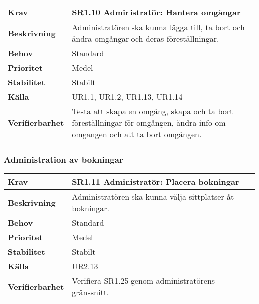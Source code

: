 \documentclass[a4paper, twoside, 11pt, titlepage]{article}
\begin{document}
		\begin{tabular} { p{2.6cm} p{12.5cm} }
			\hline
			\sffamily\textbf{Krav} & \sffamily\textbf{SR1.10 Administratör: Hantera omgångar } \\
			\hline
			\sffamily\textbf{Beskrivning} & Administratören ska kunna lägga till, ta bort och ändra omgångar och deras föreställningar.  \\
			\hline
			\sffamily\textbf{Behov} & Standard  \\
			\hline
			\sffamily\textbf{Prioritet} & Medel  \\
			\hline
			\sffamily\textbf{Stabilitet} & Stabilt  \\
			\hline
			\sffamily\textbf{Källa} & UR1.1, UR1.2, UR1.13, UR1.14  \\
			\hline
			\sffamily\textbf{Verifierbarhet} & Testa att skapa en omgång, skapa och ta bort föreställningar för omgången, ändra info om omgången och att ta bort omgången.  \\
			\hline
		\end{tabular}


		\subsubsection{Administration av bokningar}


		\begin{tabular} { p{2.6cm} p{12.5cm} }
			\hline
			\sffamily\textbf{Krav} & \sffamily\textbf{SR1.11 Administratör: Placera bokningar } \\
			\hline
			\sffamily\textbf{Beskrivning} & Administratören ska kunna välja sittplatser åt bokningar.  \\
			\hline
			\sffamily\textbf{Behov} & Standard  \\
			\hline
			\sffamily\textbf{Prioritet} & Medel  \\
			\hline
			\sffamily\textbf{Stabilitet} & Stabilt  \\
			\hline
			\sffamily\textbf{Källa} & UR2.13  \\
			\hline
			\sffamily\textbf{Verifierbarhet} & Verifiera SR1.25 genom administratörens gränssnitt.  \\
			\hline
		\end{tabular}
		\vspace{6mm}
\end{document}
